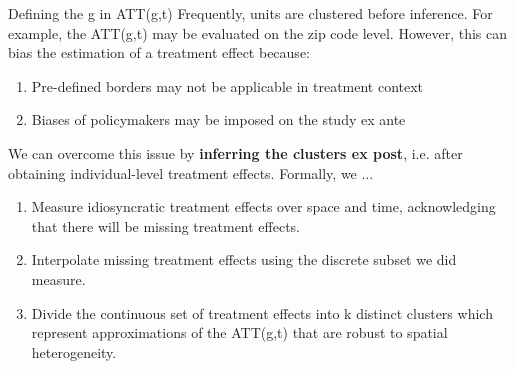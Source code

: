 \begin{frame}{Defining the g in ATT(g,t)}
Frequently, units are clustered before inference. For example, the ATT(g,t) may be evaluated on the zip code level. However, this can bias the estimation of a treatment effect because:
\vspace{5pt}

\begin{enumerate}
    \item Pre-defined borders may not be applicable in treatment context
    \item Biases of policymakers may be imposed on the study ex ante
\end{enumerate}
\vspace{5pt}

We can overcome this issue by \textbf{inferring the clusters ex post}, i.e. after obtaining individual-level treatment effects. Formally, we ...
\vspace{5pt}

\begin{enumerate}
    \item Measure idiosyncratic treatment effects over space and time, acknowledging that there will be missing treatment effects. 
    \item Interpolate missing treatment effects using the discrete subset we did measure.
    \item Divide the continuous set of treatment effects into k distinct clusters which represent approximations of the ATT(g,t) that are robust to spatial heterogeneity.  
\end{enumerate} 
\end{frame}


